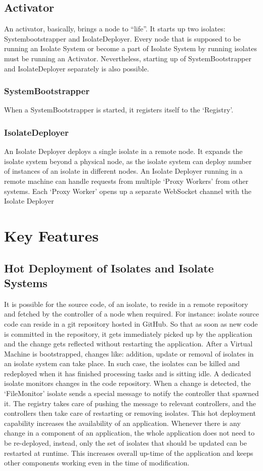 \subsection{Activator}
  An activator, basically, brings a node to “life”. It starts up two isolates: Systembootstrapper and IsolateDeployer. Every node that is supposed to be running an Isolate System or become a part of Isolate System by running isolates must be running an Activator. Nevertheless, starting up of SystemBootstrapper and IsolateDeployer separately is also possible.
  \subsubsection{SystemBootstrapper}
When a SystemBootstrapper is started, it registers itself to the ‘Registry’.
  \subsubsection{IsolateDeployer}
An Isolate Deployer deploys a single isolate in a remote node. It expands the isolate system beyond a physical node, as the isolate system can deploy number of instances of an isolate in different nodes.
An Isolate Deployer running in a remote machine can handle requests from multiple ‘Proxy Workers’ from other systems. Each ‘Proxy Worker’ opens up a separate WebSocket channel with the Isolate Deployer

\section{Key Features}
\subsection{Hot Deployment of Isolates and Isolate Systems}
It is possible for the source code, of an isolate, to reside in a remote repository and fetched by the controller of a node when required. For instance: isolate source code can reside in a git repository hosted in GitHub. So that as soon as new code is committed in the repository, it gets immediately picked up by the application and the change gets reflected without restarting the application.
After a Virtual Machine is bootstrapped, changes like: addition, update or removal of isolates in an isolate system can take place. In such case, the isolates can be killed and redeployed when it has finished processing tasks and is sitting idle. A dedicated isolate monitors changes in the code repository. When a change is detected, the ‘FileMonitor’ isolate sends a special message to notify the controller that spawned it. The registry takes care of pushing the message to relevant controllers, and the controllers then take care of restarting or removing isolates.
This hot deployment capability increases the availability of an application. Whenever there is any change in a component of an application, the whole application does not need to be re-deployed, instead, only the set of isolates that should be updated can be restarted at runtime. This increases overall up-time of the application and keeps other components working even in the time of modification.


